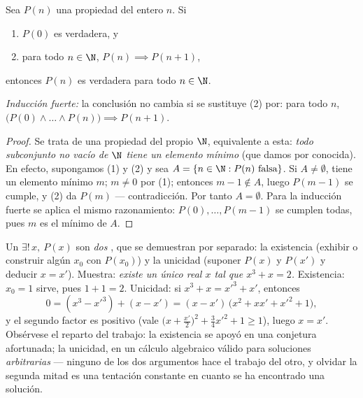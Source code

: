 \begin{theorem}[Inducción]\label{thm:b1:logic:induction}
Sea $P(n)$ una propiedad del entero $n$. Si
\begin{enumerate}
  \item $P(0)$ es verdadera, y
  \item para todo $n \in \N$, $P(n) \implies P(n+1)$,
\end{enumerate}
entonces $P(n)$ es verdadera para todo $n \in \N$.

\emph{Inducción fuerte:} la conclusión no cambia si se sustituye (2)
por: para todo $n$, $\bigl(P(0) \land \dots \land P(n)\bigr) \implies
P(n+1)$.
\end{theorem}

\begin{proof}
Se trata de una propiedad del propio $\N$, equivalente a esta:
\emph{todo subconjunto no vacío de $\N$ tiene un elemento mínimo} (que
damos por conocida). En efecto, supongamos (1) y (2) y sea
$A = \{n \in \N : P(n) \text{ falsa}\}$. Si $A \neq \emptyset$, tiene un
elemento mínimo $m$; $m \neq 0$ por (1); entonces $m - 1 \notin A$,
luego $P(m-1)$ se cumple, y (2) da $P(m)$ --- contradicción. Por tanto
$A = \emptyset$. Para la inducción fuerte se aplica el mismo
razonamiento: $P(0), \dots, P(m-1)$ se cumplen todas, pues $m$ es el
mínimo de $A$.
\end{proof}

\begin{example}\label{ex:b1:logic:uniqueexistence}
Un  $\exists!\,x,\ P(x)$ son \emph{dos} , que se
demuestran por separado: la existencia (exhibir o construir algún $x_0$
con $P(x_0)$) y la unicidad (suponer $P(x)$ y $P(x')$ y deducir
$x = x'$). Muestra: \emph{existe un único real $x$ tal que $x^3 + x =
2$.} Existencia: $x_0 = 1$ sirve, pues $1 + 1 = 2$. Unicidad: si
$x^3 + x = x'^3 + x'$, entonces
\[
0 = (x^3 - x'^3) + (x - x')
= (x - x')\,\bigl(x^2 + xx' + x'^2 + 1\bigr),
\]
y el segundo factor es positivo (vale $\bigl(x +
\tfrac{x'}2\bigr)^2 + \tfrac34 x'^2 + 1 \geq 1$), luego $x = x'$.
Obsérvese el reparto del trabajo: la existencia se apoyó en una
conjetura afortunada; la unicidad, en un cálculo algebraico válido para
soluciones \emph{arbitrarias} --- ninguno de los dos argumentos hace el
trabajo del otro, y olvidar la segunda mitad es una tentación constante
en cuanto se ha encontrado una solución.
\end{example}

